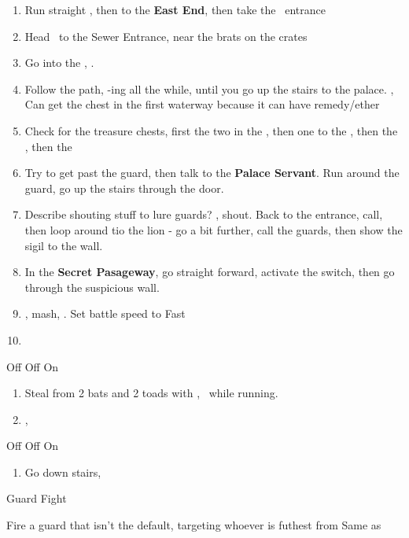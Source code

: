 \begin{enumerate}
	\item Run straight \north, then \north\west to the \textbf{East End}, then take the \lowtown\ entrance \north
	\item Head \north\east\ to the Sewer Entrance, near the brats on the crates
	\item Go into the \waterway, \cs. \save
	\item Follow the path, \flee-ing all the while, until you go up the stairs to the palace. \cs, \cs Can get the chest in the first waterway because it can have remedy/ether
	\item Check for the treasure chests, first the two in the \south\east, then one to the \west, then the \north\east, then the \north\west
	\item Try to get past the guard, then talk to the \textbf{Palace Servant}. Run around the guard, go up the stairs through the door.
	\item Describe shouting stuff to lure guards? \south\west, shout. Back to the entrance, call, then loop around tio the lion - go a bit further, call the guards, then show the sigil to the wall.
	\item In the \textbf{Secret Pasageway}, go straight forward, activate the switch, then go through the suspicious wall.
	\item \cs, mash, \cs. Set battle speed to Fast
	\item \leader{\fran}
\end{enumerate}
\begin{gambit}
	\begin{itemize}
		\vaanf Off
		\franf Off
		\balthier On
	\end{itemize}
\end{gambit}
\begin{enumerate}
	\item Steal from 2 bats and 2 toads with \vaan, \balthier\ while running.
	\item \save,
\end{enumerate}
\begin{gambit}
	\begin{itemize}
		\vaanf Off
		\franf Off
		\balthier On
	\end{itemize}
\end{gambit}
\begin{enumerate}
	\item Go down stairs, \cs
\end{enumerate}
\begin{battle}{Guard Fight}
	\begin{itemize}
		\franf Fire a guard that isn't the default, targeting whoever is futhest from \ashe
		\vaanf Same as \fran
	\end{itemize}
\end{battle}
